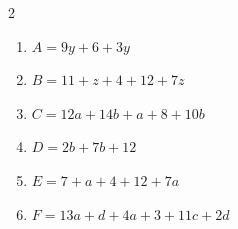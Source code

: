 \documentclass[11pt]{article}
\begin{document}
\phantom{0}
\vspace{-.5cm}


\begin{exercicedevoir}

\begin{multicols}{2}
  \begin{enumerate}[itemsep=1em]
  \item $A=9y+6+3y$ \\ \vspace{0.75cm} \encart{4cm} 
  \item $B=11+z+4+12+7z$  \\ \vspace{0.75cm} \encart{4cm}
  \item $C=12a+14b+a+8+10b$  \\ \vspace{0.75cm} \encart{4cm}
  \item $D=2b+7b+12$ \\ \vspace{0.75cm} \encart{4cm}
	\item $E=7+a+4+12+7a$  \\ \vspace{0.75cm} \encart{4cm}
	\item $F=13a+d+4a+3+11c+2d$ \\ \vspace{0.75cm} \encart{4cm}
  \end{enumerate}
\end{multicols}
\end{exercicedevoir}

\newpage
\end{document}

